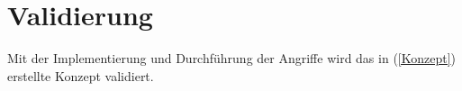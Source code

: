 \chapter{Validierung}
Mit der Implementierung und Durchführung der Angriffe wird das in (\autoref{Konzept}) erstellte Konzept validiert.